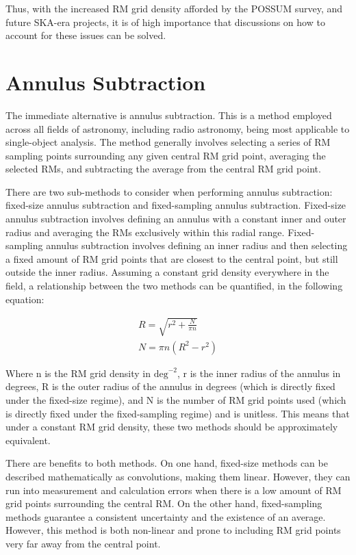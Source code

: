 Thus, with the increased RM grid density afforded by the POSSUM survey, and future SKA-era projects, it is of high importance that discussions on how to account for these issues can be solved.

\section{Annulus Subtraction}
\label{sec:annulus}

The immediate alternative is annulus subtraction. This is a method employed across all fields of astronomy, including radio astronomy, being most applicable to single-object analysis. The method generally involves selecting a series of RM sampling points surrounding any given central RM grid point, averaging the selected RMs, and subtracting the average from the central RM grid point.

There are two sub-methods to consider when performing annulus subtraction: fixed-size annulus subtraction and fixed-sampling annulus subtraction. Fixed-size annulus subtraction involves defining an annulus with a constant inner and outer radius and averaging the RMs exclusively within this radial range. Fixed-sampling annulus subtraction involves defining an inner radius and then selecting a fixed amount of RM grid points that are closest to the central point, but still outside the inner radius. Assuming a constant grid density everywhere in the field, a relationship between the two methods can be quantified, in the following equation:

\begin{equation}
    \begin{split}
        R = \sqrt{r^2 + \frac{N}{\pi n}} \\
        N = \pi n \left( R^2 - r^2 \right)
    \end{split}
    \label{eq:annulus}
\end{equation}

Where n is the RM grid density in $\mathrm{deg}^{-2}$, r is the inner radius of the annulus in degrees, R is the outer radius of the annulus in degrees (which is directly fixed under the fixed-size regime), and N is the number of RM grid points used (which is directly fixed under the fixed-sampling regime) and is unitless. This means that under a constant RM grid density, these two methods should be approximately equivalent.


There are benefits to both methods. On one hand, fixed-size methods can be described mathematically as convolutions, making them linear. However, they can run into measurement and calculation errors when there is a low amount of RM grid points surrounding the central RM. On the other hand, fixed-sampling methods guarantee a consistent uncertainty and the existence of an average. However, this method is both non-linear and prone to including RM grid points very far away from the central point.


